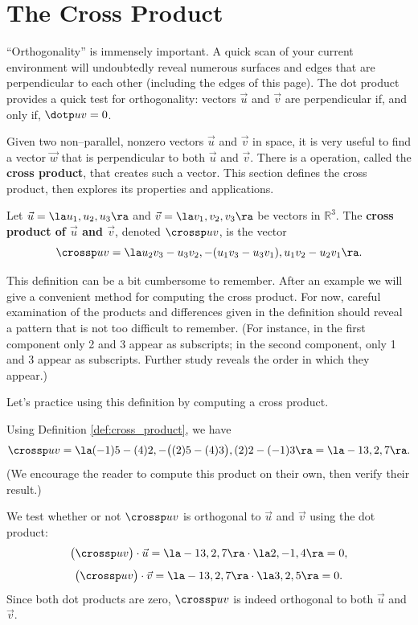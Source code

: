 \section{The Cross Product}\label{sec:cross_product}

``Orthogonality'' is immensely important. A quick scan of your current environment will undoubtedly reveal numerous surfaces and edges that are perpendicular to each other (including the edges of this page). The dot product provides a quick test for orthogonality:  vectors $\vec u$ and $\vec v$ are perpendicular if, and only if, $\dotp uv=0$. 

Given two non--parallel, nonzero vectors $\vec u$ and $\vec v$ in space, it is very useful to find a vector $\vec w$ that is perpendicular to both $\vec u$ and $\vec v$. There is a operation, called the \textbf{cross product}, that creates such a vector. This section defines the cross product, then explores its properties and applications.

{Let $\vec u =\la u_1,u_2,u_3\ra$ and $\vec v = \la v_1,v_2,v_3\ra$ be vectors in $\mathbb{R}^3$. The \textbf{cross product of $\vec u$ and $\vec v$}, denoted $\crossp uv$, is the vector
$$\crossp uv = \la u_2v_3-u_3v_2,-(u_1v_3-u_3v_1),u_1v_2-u_2v_1\ra.$$
}

This definition can be a bit cumbersome to remember. After an example we will give a convenient method for computing the cross product. For now, careful examination of the products and differences given in the definition should reveal a pattern that is not too difficult to remember. (For instance, in the first component only 2 and 3 appear as subscripts; in the second component, only 1 and 3 appear as subscripts. Further study reveals the order in which they appear.)

Let's practice using this definition by computing a cross product.\\

{Using Definition \ref{def:cross_product}, we have
$$\crossp uv = \la (-1)5-(4)2,-\big((2)5-(4)3\big), (2)2-(-1)3\ra = \la -13,2,7\ra.$$ 
(We encourage the reader to compute this product on their own, then verify their result.)

\enlargethispage{2\baselineskip}
We test whether or not $\crossp uv$ is orthogonal to $\vec u$ and $\vec v$ using the dot product:
$$\big(\crossp uv\big) \cdot \vec u = \la -13,2,7\ra \cdot \la 2,-1,4\ra = 0,$$
$$\big(\crossp uv\big) \cdot \vec v = \la -13,2,7\ra \cdot \la 3,2,5 \ra = 0.$$
Since both dot products are zero, $\crossp uv$ is indeed orthogonal to both $\vec u$ and $\vec v$.
}\\

